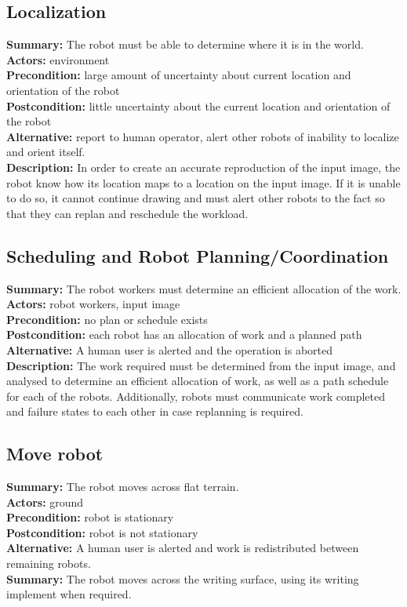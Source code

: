 \subsection{Localization}
\textbf{Summary:} The robot must be able to determine where it is in the world. \\
\textbf{Actors:} environment \\
\textbf{Precondition:} large amount of uncertainty about current location and orientation of the robot \\
\textbf{Postcondition:} little uncertainty about the current location and orientation of the robot \\
\textbf{Alternative:} report to human operator, alert other robots of inability to localize and orient itself. \\
\textbf{Description:} In order to create an accurate reproduction of the input image, the robot know how its location maps to a location on the input image. If it is unable to do so, it cannot continue drawing and must alert other robots to the fact so that they can replan and reschedule the workload. \\

\subsection{Scheduling and Robot Planning/Coordination}
\textbf{Summary:} The robot workers must determine an efficient allocation of the work. \\
\textbf{Actors:} robot workers, input image \\
\textbf{Precondition:} no plan or schedule exists \\
\textbf{Postcondition:} each robot has an allocation of work and a planned path \\
\textbf{Alternative:} A human user is alerted and the operation is aborted \\
\textbf{Description:} The work required must be determined from the input image, and analysed to determine an efficient allocation of work, as well as a path schedule for each of the robots. Additionally, robots must communicate work completed and failure states to each other in case replanning is required. \\

\subsection{Move robot}
\textbf{Summary:} The robot moves across flat terrain. \\
\textbf{Actors:} ground \\
\textbf{Precondition:} robot is stationary \\
\textbf{Postcondition:} robot is not stationary \\
\textbf{Alternative:} A human user is alerted and work is redistributed between remaining robots. \\
\textbf{Summary:} The robot moves across the writing surface, using its writing implement when required. \\

